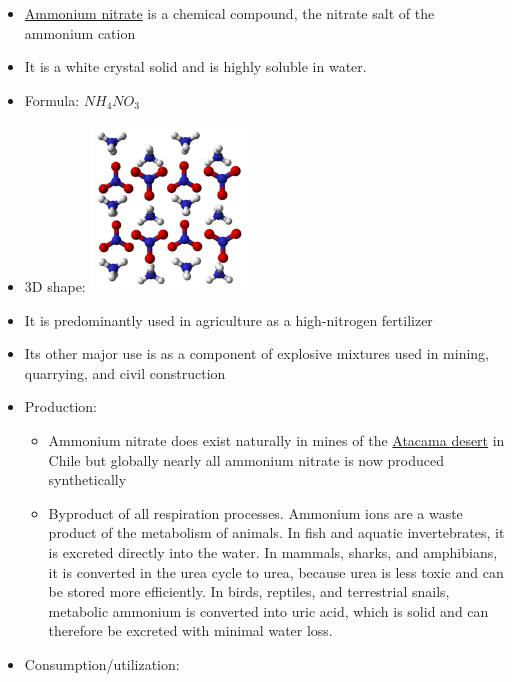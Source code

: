 \documentclass[]{book}
\providecommand{\tightlist}{%
  \setlength{\itemsep}{0pt}\setlength{\parskip}{0pt}}
\theoremstyle{definition}
\theoremstyle{definition}
\theoremstyle{definition}
\theoremstyle{remark}
\begin{document}
\begin{itemize}
\item
  \href{https://en.wikipedia.org/wiki/Ammonium_nitrate}{Ammonium
  nitrate} is a chemical compound, the nitrate salt of the ammonium
  cation
\item
  It is a white crystal solid and is highly soluble in water.
\item
  Formula: \(NH_4NO_3\)
\item
  3D shape:
  \includegraphics[width=0.33000\textwidth]{pictures/Ammonium-nitrate-xtal-3D-balls-A.png}
\item
  It is predominantly used in agriculture as a high-nitrogen fertilizer
\item
  Its other major use is as a component of explosive mixtures used in
  mining, quarrying, and civil construction
\item
  Production:

  \begin{itemize}
  \tightlist
  \item
    Ammonium nitrate does exist naturally in mines of the
    \href{https://en.wikipedia.org/wiki/Atacama_Desert}{Atacama desert}
    in Chile but globally nearly all ammonium nitrate is now produced
    synthetically
  \item
    Byproduct of all respiration processes. Ammonium ions are a waste
    product of the metabolism of animals. In fish and aquatic
    invertebrates, it is excreted directly into the water. In mammals,
    sharks, and amphibians, it is converted in the urea cycle to urea,
    because urea is less toxic and can be stored more efficiently. In
    birds, reptiles, and terrestrial snails, metabolic ammonium is
    converted into uric acid, which is solid and can therefore be
    excreted with minimal water loss.
  \end{itemize}
\item
  Consumption/utilization:


\end{itemize}
\end{document}
